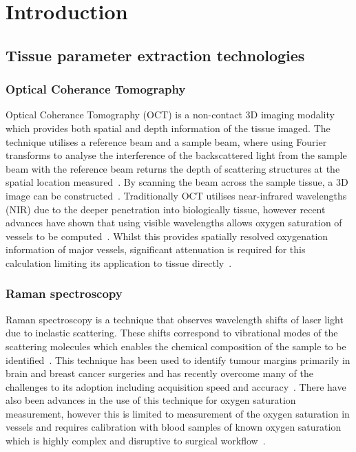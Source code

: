 \chapter{Introduction}
\label{chap:intro}
\minitoc

%
\section{Tissue parameter extraction technologies}

\subsection{Optical Coherance Tomography}
Optical Coherance Tomography (OCT) is a non-contact 3D imaging modality which provides both spatial and depth information of the tissue imaged. The technique utilises a reference beam and a sample beam, where using Fourier transforms to analyse the interference of the backscattered light from the sample beam with the reference beam returns the depth of scattering structures at the spatial location measured~\cite{Fercher2003}. By scanning the beam across the sample tissue, a 3D image can be constructed~\cite{Fercher2003}. Traditionally OCT utilises near-infrared wavelengths (NIR) due to the deeper penetration into biologically tissue, however recent advances have shown that using visible wavelengths allows oxygen saturation of vessels to be computed~\cite{Shu2017}. Whilst this provides spatially resolved oxygenation information of major vessels, significant attenuation is required for this calculation limiting its application to tissue directly~\cite{Shu2017}. 

\subsection{Raman spectroscopy}
Raman spectroscopy is a technique that observes wavelength shifts of laser light due to inelastic scattering. These shifts correspond to vibrational modes of the scattering molecules which enables the chemical composition of the sample to be identified~\cite{Kong2015}. This technique has been used to identify tumour margins primarily in brain and breast cancer surgeries and has recently overcome many of the challenges to its adoption including acquisition speed and accuracy~\cite{Kong2015}. There have also been advances in the use of this technique for oxygen saturation measurement, however this is limited to measurement of the oxygen saturation in vessels and requires calibration with blood samples of known oxygen saturation which is highly complex and disruptive to surgical workflow~\cite{TorresFilho2016}.

